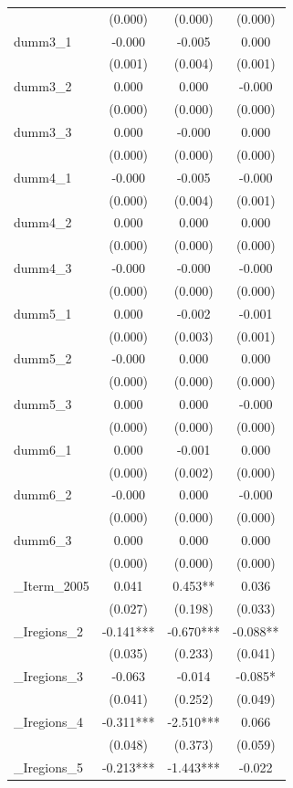 \documentclass[]{article}
\begin{document}
\begin{tabular}{lccc}
 & (0.000) & (0.000) & (0.000) \\
dumm3\_1 & -0.000 & -0.005 & 0.000 \\
 & (0.001) & (0.004) & (0.001) \\
dumm3\_2 & 0.000 & 0.000 & -0.000 \\
 & (0.000) & (0.000) & (0.000) \\
dumm3\_3 & 0.000 & -0.000 & 0.000 \\
 & (0.000) & (0.000) & (0.000) \\
dumm4\_1 & -0.000 & -0.005 & -0.000 \\
 & (0.000) & (0.004) & (0.001) \\
dumm4\_2 & 0.000 & 0.000 & 0.000 \\
 & (0.000) & (0.000) & (0.000) \\
dumm4\_3 & -0.000 & -0.000 & -0.000 \\
 & (0.000) & (0.000) & (0.000) \\
dumm5\_1 & 0.000 & -0.002 & -0.001 \\
 & (0.000) & (0.003) & (0.001) \\
dumm5\_2 & -0.000 & 0.000 & 0.000 \\
 & (0.000) & (0.000) & (0.000) \\
dumm5\_3 & 0.000 & 0.000 & -0.000 \\
 & (0.000) & (0.000) & (0.000) \\
dumm6\_1 & 0.000 & -0.001 & 0.000 \\
 & (0.000) & (0.002) & (0.000) \\
dumm6\_2 & -0.000 & 0.000 & -0.000 \\
 & (0.000) & (0.000) & (0.000) \\
dumm6\_3 & 0.000 & 0.000 & 0.000 \\
 & (0.000) & (0.000) & (0.000) \\
\_Iterm\_2005 & 0.041 & 0.453** & 0.036 \\
 & (0.027) & (0.198) & (0.033) \\
\_Iregions\_2 & -0.141*** & -0.670*** & -0.088** \\
 & (0.035) & (0.233) & (0.041) \\
\_Iregions\_3 & -0.063 & -0.014 & -0.085* \\
 & (0.041) & (0.252) & (0.049) \\
\_Iregions\_4 & -0.311*** & -2.510*** & 0.066 \\
 & (0.048) & (0.373) & (0.059) \\
\_Iregions\_5 & -0.213*** & -1.443*** & -0.022 \\

\end{tabular}
\end{document}
